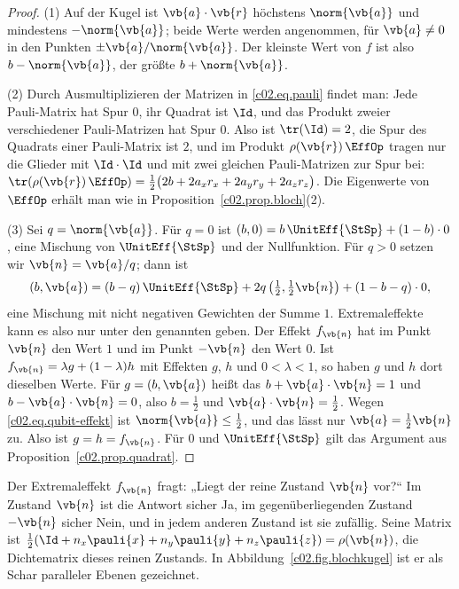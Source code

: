 \begin{proof}
  (1) Auf der Kugel ist $\vb{a}\cdot\vb{r}$ höchstens $\norm{\vb{a}}$ und mindestens
  $-\norm{\vb{a}}$; beide Werte werden angenommen, für $\vb{a} \neq 0$ in den Punkten
  $\pm\vb{a}/\norm{\vb{a}}$. Der kleinste Wert von $f$ ist also $b - \norm{\vb{a}}$, der
  größte $b + \norm{\vb{a}}$.

  (2) Durch Ausmultiplizieren der Matrizen in \eqref{c02.eq.pauli} findet man: Jede
  Pauli-Matrix hat Spur $0$, ihr Quadrat ist $\Id$, und das Produkt zweier verschiedener
  Pauli-Matrizen hat Spur $0$. Also ist $\tr(\Id) = 2$, die Spur des Quadrats einer
  Pauli-Matrix ist $2$, und im Produkt $\rho(\vb{r})\,\EffOp$ tragen nur die Glieder mit
  $\Id\cdot\Id$ und mit zwei gleichen Pauli-Matrizen zur Spur bei:
  $\tr(\rho(\vb{r})\,\EffOp) = \tfrac12\bigl(2b + 2 a_x r_x + 2 a_y r_y + 2 a_z r_z\bigr)$.
  Die Eigenwerte von $\EffOp$ erhält man wie in Proposition~\ref{c02.prop.bloch}(2).

  (3) Sei $q = \norm{\vb{a}}$. Für $q = 0$ ist
  $(b, 0) = b\, \UnitEff{\StSp} + (1 - b)\cdot 0$, eine Mischung von $\UnitEff{\StSp}$ und
  der Nullfunktion. Für $q > 0$ setzen wir $\vb{n} = \vb{a}/q$; dann ist
  \begin{equation*}
    (b, \vb{a}) = (b - q)\, \UnitEff{\StSp} + 2q\, \bigl(\tfrac12, \tfrac12\vb{n}\bigr) + (1 - b - q)\cdot 0 ,
  \end{equation*}
  eine Mischung mit nicht negativen Gewichten der Summe $1$. Extremaleffekte kann es also
  nur unter den genannten geben. Der Effekt $f_{\vb{n}}$ hat im Punkt $\vb{n}$ den Wert
  $1$ und im Punkt $-\vb{n}$ den Wert $0$. Ist $f_{\vb{n}} = \lambda g + (1-\lambda) h$ mit
  Effekten $g$, $h$ und $0 < \lambda < 1$, so haben $g$ und $h$ dort dieselben Werte. Für
  $g = (b, \vb{a})$ heißt das $b + \vb{a}\cdot\vb{n} = 1$ und $b - \vb{a}\cdot\vb{n} = 0$,
  also $b = \tfrac12$ und $\vb{a}\cdot\vb{n} = \tfrac12$. Wegen
  \eqref{c02.eq.qubit-effekt} ist $\norm{\vb{a}} \leq \tfrac12$, und das lässt nur
  $\vb{a} = \tfrac12\vb{n}$ zu. Also ist $g = h = f_{\vb{n}}$. Für $0$ und
  $\UnitEff{\StSp}$ gilt das Argument aus Proposition~\ref{c02.prop.quadrat}.
\end{proof}

Der Extremaleffekt $f_{\vb{n}}$ fragt: „Liegt der reine Zustand $\vb{n}$ vor?“ Im Zustand
$\vb{n}$ ist die Antwort sicher Ja, im gegenüberliegenden Zustand $-\vb{n}$ sicher Nein, und
in jedem anderen Zustand ist sie zufällig. Seine Matrix ist
$\tfrac12(\Id + n_x\pauli{x} + n_y\pauli{y} + n_z\pauli{z}) = \rho(\vb{n})$, die Dichtematrix
dieses reinen Zustands. In Abbildung~\ref{c02.fig.blochkugel} ist er als Schar paralleler
Ebenen gezeichnet.

